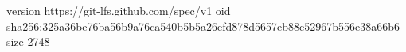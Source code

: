 version https://git-lfs.github.com/spec/v1
oid sha256:325a36be76ba56b9a76ca540b5b5a26efd878d5657eb88c52967b556e38a66b6
size 2748
